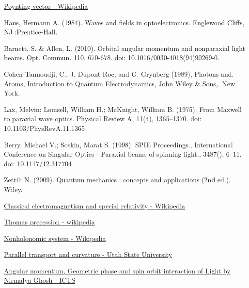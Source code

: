 \documentclass[11pt,a4paper]{article}
\numberwithin{equation}{section}
\begin{document}
\begin{thebibliography}{999}
	 \href{https://en.wikipedia.org/wiki/Poynting_vector}{Poynting vector - Wikipedia}
	  
	 Haus, Hermann A. (1984). Waves and fields in optoelectronics. Englewood Cliffs, NJ :Prentice-Hall.
	 
	 Barnett, S. \& Allen, L. (2010). Orbital angular momentum and nonparaxial light beams. Opt. Commun. 110. 670-678. doi: 10.1016/0030-4018(94)90269-0.
	 
	 Cohen-Tannoudji, C., J. Dupont-Roc, and G. Grynberg (1989), Photons and. Atoms, Introduction to Quantum Electrodynamics, John Wiley \& Sons,. New York.
	 
	 Lax, Melvin; Louisell, William H.; McKnight, William B. (1975). From Maxwell to paraxial wave optics. Physical Review A, 11(4), 1365–1370. doi: 10.1103/PhysRevA.11.1365
	 
	  Berry, Michael V.; Soskin, Marat S. (1998). SPIE Proceedings., International Conference on Singular Optics - Paraxial beams of spinning light., 3487(), 6–11. doi: 10.1117/12.317704 
	  
	  Zettili N. (2009). Quantum mechanics : concepts and applications (2nd ed.). Wiley.
	  
	  \href{https://en.wikipedia.org/wiki/Classical_electromagnetism_and_special_relativity}{Classical electromagnetism and special relativity - Wikipedia}
	  
	  \href{https://en.wikipedia.org/wiki/Thomas_precession}{Thomas precession - wikipedia}
	  
	  
	  \href{https://en.wikipedia.org/wiki/Nonholonomic_system}{Nonholonomic system - Wikipedia}
	  
	  \href{https://www.physics.usu.edu/Wheeler/GenRel2013/Notes/Curvature.pdf}{Parallel transport and curvature - Utah State University}
	  
	  \href{https://www.youtube.com/watch?v=e1ix-oBH5Ng&list=PL04QVxpjcnjjUn4IbvSncV24Uazej5fBI&index=2}{ Angular momentum, Geometric phase and spin orbit interaction of Light by Nirmalya Ghosh - ICTS}
	  

\end{thebibliography}
\end{document}
